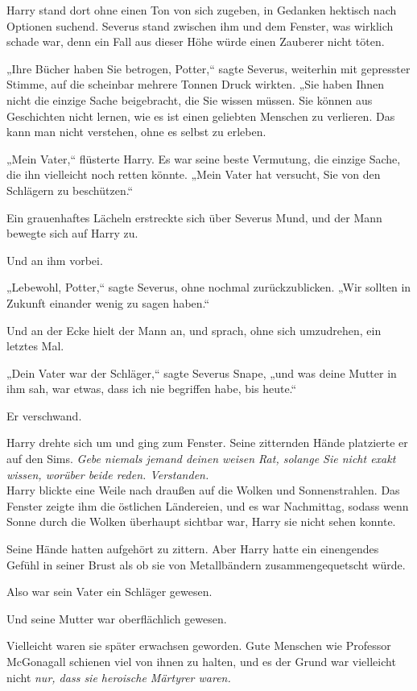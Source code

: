 {Harry stand dort ohne einen Ton von sich zugeben, in Gedanken hektisch nach Optionen suchend. Severus stand zwischen ihm und dem Fenster, was wirklich schade war, denn ein Fall aus dieser Höhe würde einen Zauberer nicht töten.

„Ihre Bücher haben Sie betrogen, Potter,“ sagte Severus, weiterhin mit gepresster Stimme, auf die scheinbar mehrere Tonnen Druck wirkten. „Sie haben Ihnen nicht die einzige Sache beigebracht, die Sie wissen müssen. Sie können aus Geschichten nicht lernen, wie es ist einen geliebten Menschen zu verlieren. Das kann man nicht verstehen, ohne es selbst zu erleben.

„Mein Vater,“ flüsterte Harry. Es war seine beste Vermutung, die einzige Sache, die ihn vielleicht noch retten könnte. „Mein Vater hat versucht, Sie von den Schlägern zu beschützen.“

Ein grauenhaftes Lächeln erstreckte sich über Severus Mund, und der Mann bewegte sich auf Harry zu.

Und an ihm vorbei.

„Lebewohl, Potter,“ sagte Severus, ohne nochmal zurückzublicken. „Wir sollten in Zukunft einander wenig zu sagen haben.“

Und an der Ecke hielt der Mann an, und sprach, ohne sich umzudrehen, ein letztes Mal.

„Dein Vater war der Schläger,“ sagte Severus Snape, „und was deine Mutter in ihm sah, war etwas, dass ich nie begriffen habe, bis heute.“

Er verschwand.

Harry drehte sich um und ging zum Fenster. Seine zitternden Hände platzierte er auf den Sims. \emph{Gebe niemals jemand deinen weisen Rat, \emph{solange Sie nicht exakt wissen, worüber beide reden.} \emph{Verstanden.}}\\ Harry blickte eine Weile nach draußen auf die Wolken und Sonnenstrahlen. Das Fenster zeigte ihm die östlichen Ländereien, und es war Nachmittag, sodass wenn Sonne durch die Wolken überhaupt sichtbar war, Harry sie nicht sehen konnte.

Seine Hände hatten aufgehört zu zittern. Aber Harry hatte ein einengendes Gefühl in seiner Brust als ob sie von Metallbändern zusammengequetscht würde.

Also war sein Vater ein Schläger gewesen.

Und seine Mutter war oberflächlich gewesen.

Vielleicht waren sie später erwachsen geworden. Gute Menschen wie Professor McGonagall schienen viel von ihnen zu halten, und es der Grund war vielleicht nicht \emph{nur, dass sie heroische Märtyrer waren.}

}
